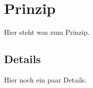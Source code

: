 \section{Prinzip}
\begin{frame}
Hier steht was zum Prinzip.
\end{frame}

\subsection{Details}
\begin{frame}
Hier noch ein paar Details.
\end{frame}